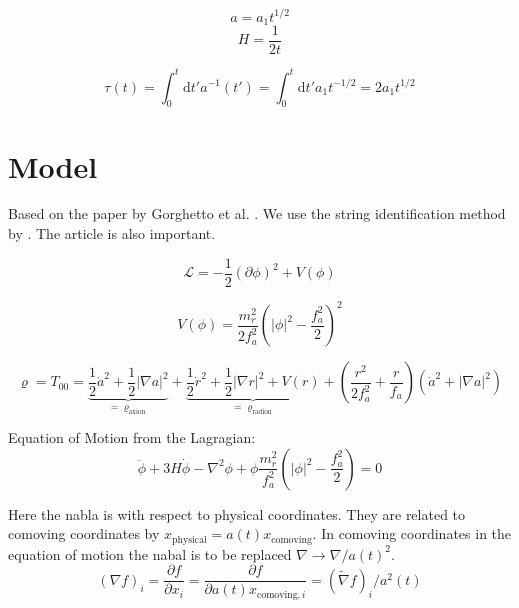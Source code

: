 \documentclass[a4paper]{article}
\begin{document}
\begin{equation}
    a = a_1 t^{1/2}
\end{equation}
\begin{equation}
    H = \frac{1}{2t}
\end{equation}

\begin{equation}
    \tau(t) = \int_0^t \mathrm{d} t' a^{-1}(t') = \int_0^t \mathrm{d} t' a_1 t^{-1/2} = 2 a_1 t^{1/2}
\end{equation}

\section{Model}

Based on the paper by Gorghetto et al. \cite{axions_from_strings}.
We use the string identification method by \cite{axion_dark_matter_strings_and_their_cores}.
The article \cite{improved_estimation_hiramatsu} is also important.

\begin{equation}
    \mathcal{L} = - \frac{1}{2} ( \partial \phi )^2 + V(\phi)
\end{equation}

\begin{equation}
    V(\phi) = \frac{m_r^2}{2 f_a^2}\left( |\phi|^2 - \frac{f_a^2}{2} \right)^2
\end{equation}

\begin{equation}
    \varrho = T_{00} = \underbrace{\frac{1}{2} \dot{a}^2 + \frac{1}{2} | \nabla a|^2}_{= \varrho_\mathrm{axion}}
    + \underbrace{ \frac{1}{2} \dot{r}^2 + \frac{1}{2} | \nabla r|^2 + V(r) }_{= \varrho_\mathrm{radion}}
    + \left(\frac{r^2}{2 f_a^2} + \frac{r}{f_a} \right) (\dot{a}^2 + |\nabla a|^2)
\end{equation}

Equation of Motion from the Lagragian:
\begin{equation}
    \ddot{\phi} + 3 H \dot{\phi} - \nabla^2 \phi + \phi \frac{m_r^2}{f_a^2} \left( |\phi|^2 - \frac{f_a^2}{2} \right) = 0
\end{equation}

Here the nabla is with respect to physical coordinates. They are related to comoving  coordinates by $x_\mathrm{physical} = a(t) x_\mathrm{comoving}$.
In comoving coordinates in the equation of motion the nabal is to be replaced $\nabla \to \nabla / a(t)^2$.
\begin{equation}
    (\nabla f)_i = \frac{\partial f}{\partial x_i} = \frac{\partial f}{\partial a(t) x_{\mathrm{comoving}, i}} = (\tilde{\nabla} f)_i / a^2(t)
\end{equation}
\end{document}
